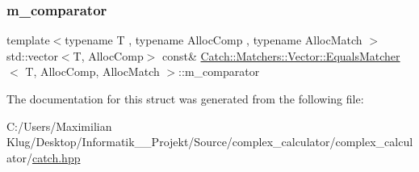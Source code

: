\subsubsection{\texorpdfstring{m\+\_\+comparator}{m\_comparator}}
{\footnotesize\ttfamily template$<$typename T , typename Alloc\+Comp , typename Alloc\+Match $>$ \\
std\+::vector$<$T, Alloc\+Comp$>$ const\& \mbox{\hyperlink{struct_catch_1_1_matchers_1_1_vector_1_1_equals_matcher}{Catch\+::\+Matchers\+::\+Vector\+::\+Equals\+Matcher}}$<$ T, Alloc\+Comp, Alloc\+Match $>$\+::m\+\_\+comparator}



The documentation for this struct was generated from the following file\+:\begin{DoxyCompactItemize}
\item 
C\+:/\+Users/\+Maximilian Klug/\+Desktop/\+Informatik\+\_\+\_\+\+Projekt/\+Source/complex\+\_\+calculator/complex\+\_\+calculator/\mbox{\hyperlink{catch_8hpp}{catch.\+hpp}}\end{DoxyCompactItemize}
